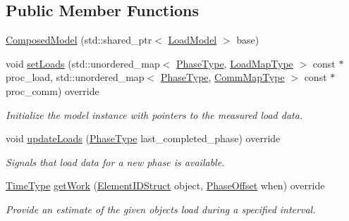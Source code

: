 \subsection*{Public Member Functions}
\begin{DoxyCompactItemize}
\item 
\hyperlink{classvt_1_1vrt_1_1collection_1_1balance_1_1_composed_model_a84b77c1fceb9e07a0706b896a4d9e9c9}{Composed\+Model} (std\+::shared\+\_\+ptr$<$ \hyperlink{structvt_1_1vrt_1_1collection_1_1balance_1_1_load_model}{Load\+Model} $>$ base)
\item 
void \hyperlink{classvt_1_1vrt_1_1collection_1_1balance_1_1_composed_model_a3a7da5e81a933ea88f87a1226fd3b401}{set\+Loads} (std\+::unordered\+\_\+map$<$ \hyperlink{namespacevt_a46ce6733d5cdbd735d561b7b4029f6d7}{Phase\+Type}, \hyperlink{namespacevt_1_1vrt_1_1collection_1_1balance_a5339303db2e1ce964d783a53fd74e6b1}{Load\+Map\+Type} $>$ const $\ast$proc\+\_\+load, std\+::unordered\+\_\+map$<$ \hyperlink{namespacevt_a46ce6733d5cdbd735d561b7b4029f6d7}{Phase\+Type}, \hyperlink{namespacevt_1_1vrt_1_1collection_1_1balance_a01ee1fb0ae2da1d2ab7fdca3be9ae351}{Comm\+Map\+Type} $>$ const $\ast$proc\+\_\+comm) override
\begin{DoxyCompactList}\small\item\em Initialize the model instance with pointers to the measured load data. \end{DoxyCompactList}\item 
void \hyperlink{classvt_1_1vrt_1_1collection_1_1balance_1_1_composed_model_ad8108b4392d63b7f09e443920a64933a}{update\+Loads} (\hyperlink{namespacevt_a46ce6733d5cdbd735d561b7b4029f6d7}{Phase\+Type} last\+\_\+completed\+\_\+phase) override
\begin{DoxyCompactList}\small\item\em Signals that load data for a new phase is available. \end{DoxyCompactList}\item 
\hyperlink{namespacevt_a876a9d0cd5a952859c72de8a46881442}{Time\+Type} \hyperlink{classvt_1_1vrt_1_1collection_1_1balance_1_1_composed_model_a9410479ba5a5950fd56bb076717e48e5}{get\+Work} (\hyperlink{namespacevt_1_1vrt_1_1collection_1_1balance_a9f5b53fafb270212279a4757d2c4cd28}{Element\+I\+D\+Struct} object, \hyperlink{structvt_1_1vrt_1_1collection_1_1balance_1_1_phase_offset}{Phase\+Offset} when) override
\begin{DoxyCompactList}\small\item\em Provide an estimate of the given object\textquotesingle{}s load during a specified interval. \end{DoxyCompactList}\item 

\end{DoxyCompactItemize}
